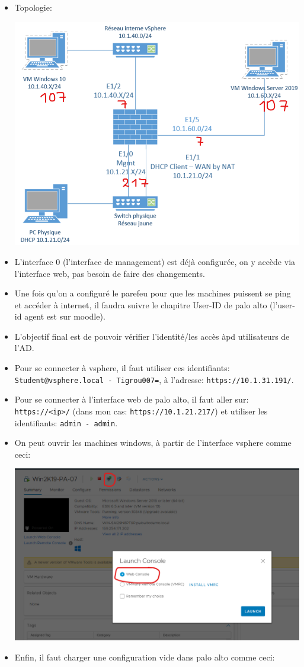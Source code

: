 \documentclass[a4paper]{article}
\begin{document}
\begin{itemize}
    \item Topologie:
    \begin{center} \includegraphics[width=0.75\linewidth]{images/topologie-02.png} \end{center}
    \item L'interface 0 (l'interface de management) est déjà configurée, on y accède via l'interface web, pas besoin de faire des changements.
    \item Une fois qu'on a configuré le parefeu pour que les machines puissent se ping et accéder à internet, il faudra suivre le chapitre User-ID de palo alto (l'user-id agent est sur moodle).
    \item L'objectif final est de pouvoir vérifier l'identité/les accès àpd utilisateurs de l'AD.
    \item Pour se connecter à vsphere, il faut utiliser ces identifiants: \texttt{Student@vsphere.local - Tigrou007=}, à l'adresse: \texttt{https://10.1.31.191/}.
    \item Pour se connecter à l'interface web de palo alto, il faut aller sur: \texttt{https://<ip>/} (dans mon cas: \texttt{https://10.1.21.217/}) et utiliser les identifiants: \texttt{admin - admin}.
    \item On peut ouvrir les machines windows, à partir de l'interface vsphere comme ceci:
    \begin{center} \includegraphics[width=0.80\linewidth]{images/web-console.png} \end{center}
    \item Enfin, il faut charger une configuration vide dans palo alto comme ceci:
\end{itemize}
\end{document}
